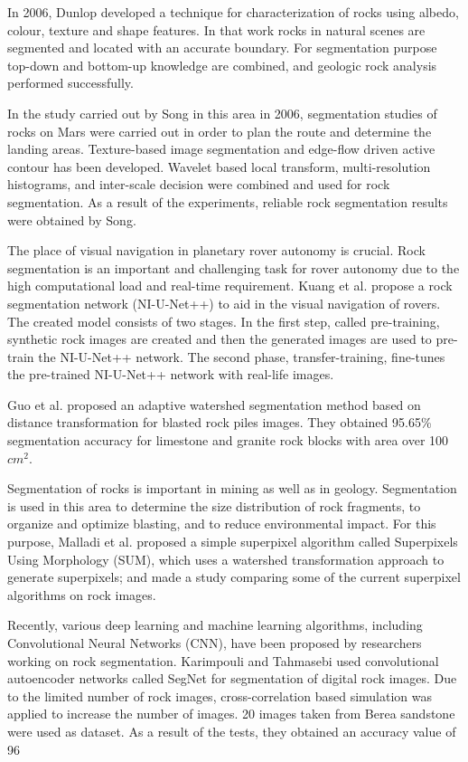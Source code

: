 \documentclass[a4paper,fleqn]{cas-sc}
\begin{document}
In 2006, Dunlop \citep{dunlop2006automatic} developed a technique for characterization of rocks using albedo, colour, texture and shape features. In that work rocks in natural scenes are segmented and located with an accurate boundary. For segmentation purpose top-down and bottom-up knowledge are combined, and geologic rock analysis performed successfully.

In the study carried out by Song \citep{Song2006AFF} in this area in 2006, segmentation studies of rocks on Mars were carried out in order to plan the route and determine the landing areas. Texture-based image segmentation and edge-flow driven active contour has been developed. Wavelet based local transform, multi-resolution histograms, and inter-scale decision were combined and used for rock segmentation. As a result of the experiments, reliable rock segmentation results were obtained by Song.

The place of visual navigation in planetary rover autonomy is crucial. Rock segmentation is an important and challenging task for rover autonomy due to the high computational load and real-time requirement. Kuang et al. \citep{kuang2021rock} propose a rock segmentation network (NI-U-Net++) to aid in the visual navigation of rovers. The created model consists of two stages. In the first step, called pre-training, synthetic rock images are created and then the generated images are used to pre-train the NI-U-Net++ network. The second phase, transfer-training, fine-tunes the pre-trained NI-U-Net++ network with real-life images.

Guo et al. \citep{guo2022method} proposed an adaptive watershed segmentation method based on distance transformation for blasted rock piles images. They obtained 95.65\% segmentation accuracy for limestone and granite rock blocks with area over 100 $cm^2$. 

Segmentation of rocks is important in mining as well as in geology. Segmentation is used in this area to determine the size distribution of rock fragments, to organize and optimize blasting, and to reduce environmental impact. For this purpose, Malladi et al. \citep{malladi2014superpixels} proposed a simple superpixel algorithm called Superpixels Using Morphology (SUM), which uses a watershed transformation approach to generate superpixels; and made a study comparing some of the current superpixel algorithms on rock images.

Recently, various deep learning and machine learning algorithms, including Convolutional Neural Networks (CNN), have been proposed by researchers working on rock segmentation. Karimpouli and Tahmasebi \citep{karimpouli2019segmentation} used convolutional autoencoder networks called SegNet for segmentation of digital rock images. Due to the limited number of rock images, cross-correlation based simulation was applied to increase the number of images. 20 images taken from Berea sandstone were used as dataset. As a result of the tests, they obtained an accuracy value of 96%
\end{document}
